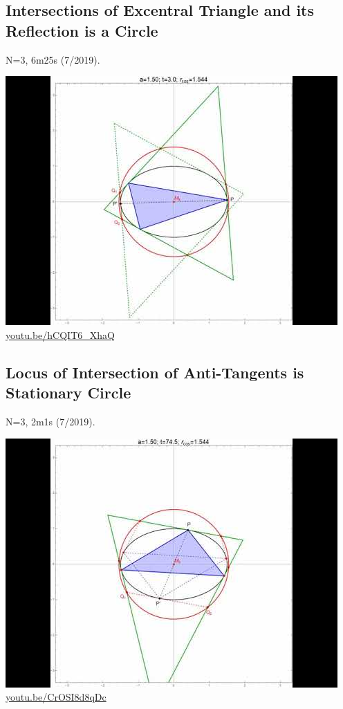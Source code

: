 \documentclass[12pt]{amsart}
\begin{document}
\subsection{Intersections of Excentral Triangle and its Reflection is a Circle}
\label{vid:hCQIT6_XhaQ}
\noindent N=3, 6m25s (7/2019). 
\begin{center}\includegraphics[width=.5\textwidth]{pics/hCQIT6_XhaQ.jpg} \\ 
\href{https://youtu.be/hCQIT6_XhaQ}{\url{youtu.be/hCQIT6\_XhaQ}}\end{center}
% 

\subsection{Locus of Intersection of Anti-Tangents is Stationary Circle}
\label{vid:CrOSI8d8qDc}
\noindent N=3, 2m1s (7/2019). 
\begin{center}\includegraphics[width=.5\textwidth]{pics/CrOSI8d8qDc.jpg} \\ 
\href{https://youtu.be/CrOSI8d8qDc}{\url{youtu.be/CrOSI8d8qDc}}\end{center}
% 
\end{document}
